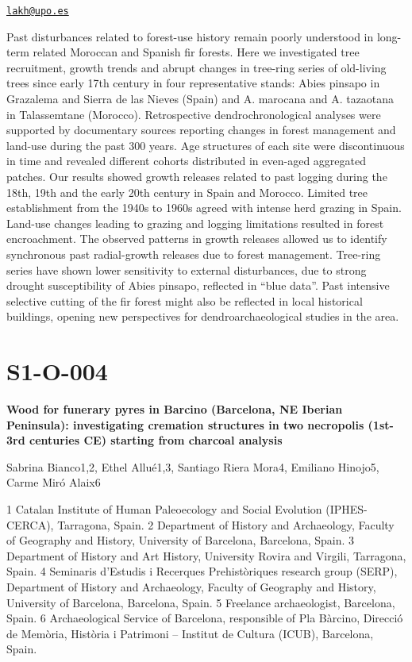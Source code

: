 \documentclass[
]{book}
\begin{document}
\href{mailto:lakh@upo.es}{\nolinkurl{lakh@upo.es}}

Past disturbances related to forest-use history remain poorly understood
in long-term related Moroccan and Spanish fir forests. Here we
investigated tree recruitment, growth trends and abrupt changes in
tree-ring series of old-living trees since early 17th century in four
representative stands: Abies pinsapo in Grazalema and Sierra de las
Nieves (Spain) and A. marocana and A. tazaotana in Talassemtane
(Morocco). Retrospective dendrochronological analyses were supported by
documentary sources reporting changes in forest management and land-use
during the past 300 years. Age structures of each site were
discontinuous in time and revealed different cohorts distributed in
even-aged aggregated patches. Our results showed growth releases related
to past logging during the 18th, 19th and the early 20th century in
Spain and Morocco. Limited tree establishment from the 1940s to 1960s
agreed with intense herd grazing in Spain. Land-use changes leading to
grazing and logging limitations resulted in forest encroachment. The
observed patterns in growth releases allowed us to identify synchronous
past radial-growth releases due to forest management. Tree-ring series
have shown lower sensitivity to external disturbances, due to strong
drought susceptibility of Abies pinsapo, reflected in ``blue data''. Past
intensive selective cutting of the fir forest might also be reflected in
local historical buildings, opening new perspectives for
dendroarchaeological studies in the area.

\hypertarget{s1-o-004}{%
\section*{S1-O-004}\label{s1-o-004}}

\textbf{Wood for funerary pyres in Barcino (Barcelona, NE Iberian Peninsula):
investigating cremation structures in two necropolis (1st-3rd centuries
CE) starting from charcoal analysis}

Sabrina Bianco1,2, Ethel Allué1,3, Santiago Riera Mora4, Emiliano
Hinojo5, Carme Miró Alaix6

1 Catalan Institute of Human Paleoecology and Social Evolution
(IPHES-CERCA), Tarragona, Spain. 2 Department of History and
Archaeology, Faculty of Geography and History, University of Barcelona,
Barcelona, Spain. 3 Department of History and Art History, University
Rovira and Virgili, Tarragona, Spain. 4 Seminaris d'Estudis i Recerques
Prehistòriques research group (SERP), Department of History and
Archaeology, Faculty of Geography and History, University of Barcelona,
Barcelona, Spain. 5 Freelance archaeologist, Barcelona, Spain. 6
Archaeological Service of Barcelona, responsible of Pla Bàrcino,
Direcció de Memòria, Història i Patrimoni -- Institut de Cultura (ICUB),
Barcelona, Spain.
\end{document}

